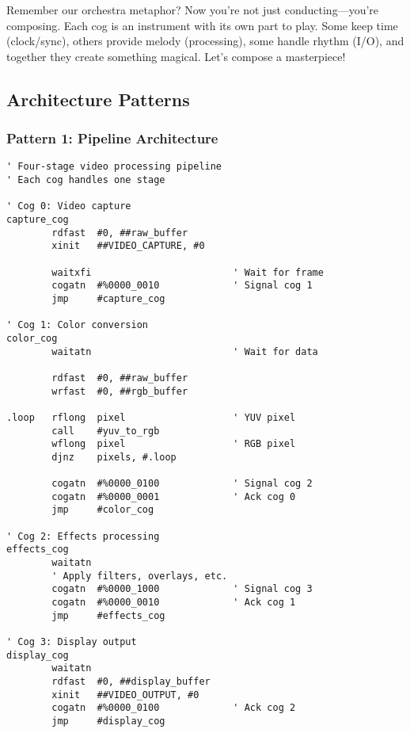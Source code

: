 \documentclass[11pt]{book}
\begin{document}
Remember our orchestra metaphor? Now you're not just conducting---you're
composing. Each cog is an instrument with its own part to play. Some
keep time (clock/sync), others provide melody (processing), some handle
rhythm (I/O), and together they create something magical. Let's compose
a masterpiece!

\hypertarget{architecture-patterns}{%
\subsection{Architecture Patterns}\label{architecture-patterns}}

\hypertarget{pattern-1-pipeline-architecture}{%
\subsubsection{Pattern 1: Pipeline
Architecture}\label{pattern-1-pipeline-architecture}}

\begin{lstlisting}
' Four-stage video processing pipeline
' Each cog handles one stage

' Cog 0: Video capture
capture_cog
        rdfast  #0, ##raw_buffer
        xinit   ##VIDEO_CAPTURE, #0
        
        waitxfi                         ' Wait for frame
        cogatn  #%0000_0010             ' Signal cog 1
        jmp     #capture_cog

' Cog 1: Color conversion
color_cog
        waitatn                         ' Wait for data
        
        rdfast  #0, ##raw_buffer
        wrfast  #0, ##rgb_buffer
        
.loop   rflong  pixel                   ' YUV pixel
        call    #yuv_to_rgb
        wflong  pixel                   ' RGB pixel
        djnz    pixels, #.loop
        
        cogatn  #%0000_0100             ' Signal cog 2
        cogatn  #%0000_0001             ' Ack cog 0
        jmp     #color_cog

' Cog 2: Effects processing
effects_cog
        waitatn
        ' Apply filters, overlays, etc.
        cogatn  #%0000_1000             ' Signal cog 3
        cogatn  #%0000_0010             ' Ack cog 1
        jmp     #effects_cog

' Cog 3: Display output
display_cog
        waitatn
        rdfast  #0, ##display_buffer
        xinit   ##VIDEO_OUTPUT, #0
        cogatn  #%0000_0100             ' Ack cog 2
        jmp     #display_cog
\end{lstlisting}
\end{document}
